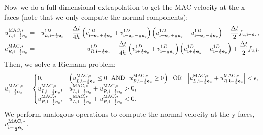 Now we do a full-dimensional extrapolation to get the MAC velocity at
the x-faces (note that we only compute the normal components):
\begin{eqnarray}
u_{L,{\bf i}-\frac{1}{2}{\bf e}_x}^{\rm MAC,*} &=& u_{L,{\bf i}-\frac{1}{2}{\bf e}_x}^{1D} - \frac{\Delta t}{4h}\left(v_{{\bf i}-{\bf e}_x+\frac{1}{2}{\bf e}_y}^{1D}+v_{{\bf i}-{\bf e}_x-\frac{1}{2}{\bf e}_y}^{1D}\right)\left(u_{{\bf i}-{\bf e}_x+\frac{1}{2}{\bf e}_y}^{1D} - u_{{\bf i}-{\bf e}_x-\frac{1}{2}{\bf e}_y}^{1D}\right) + \frac{\Delta t}{2}f_{u,{\bf i}-{\bf e}_x}, \\
u_{R,{\bf i}-\frac{1}{2}{\bf e}_x}^{\rm MAC,*} &=& u_{R,{\bf i}-\frac{1}{2}{\bf e}_x}^{1D} - \frac{\Delta t}{4h}\left(v_{{\bf i}+\frac{1}{2}{\bf e}_y}^{1D}+v_{{\bf i}-\frac{1}{2}{\bf e}_y}^{1D}\right)\left(u_{{\bf i}+\frac{1}{2}{\bf e}_y}^{1D} - u_{{\bf i}-\frac{1}{2}{\bf e}_y}^{1D}\right) + \frac{\Delta t}{2}f_{u,{\bf i}}.
\end{eqnarray}
Then, we solve a Riemann problem:
\begin{equation}
u_{{\bf i}-\frac{1}{2}{\bf e}_x}^{\rm MAC,*} =
\begin{cases}
0, & \left(u_{L,{\bf i}-\frac{1}{2}{\bf e}_x}^{\rm MAC,*} \le 0 ~~ {\rm AND} ~~ u_{R,{\bf i}-\frac{1}{2}{\bf e}_x}^{\rm MAC,*} \ge 0\right) ~~ {\rm OR} ~~ \left|u_{L,{\bf i}-\frac{1}{2}{\bf e}_x}^{\rm MAC,*} + u_{R,{\bf i}-\frac{1}{2}{\bf e}_x}^{\rm MAC,*}\right| < \epsilon, \\
u_{L,{\bf i}-\frac{1}{2}{\bf e}_x}^{\rm MAC,*}, & u_{L,{\bf i}-\frac{1}{2}{\bf e}_x}^{\rm MAC,*} + u_{R,{\bf i}-\frac{1}{2}{\bf e}_x}^{\rm MAC,*} > 0, \\
u_{R,{\bf i}-\frac{1}{2}{\bf e}_x}^{\rm MAC,*}, & u_{L,{\bf i}-\frac{1}{2}{\bf e}_x}^{\rm MAC,*} + u_{R,{\bf i}-\frac{1}{2}{\bf e}_x}^{\rm MAC,*} < 0.
\end{cases}\label{umac Riemann Problem}
\end{equation}
We perform analogous operations to compute the normal velocity at the
y-faces, $v^{\rm MAC,*}_{{\bf i}-\frac{1}{2}{\bf e}_y}$.

